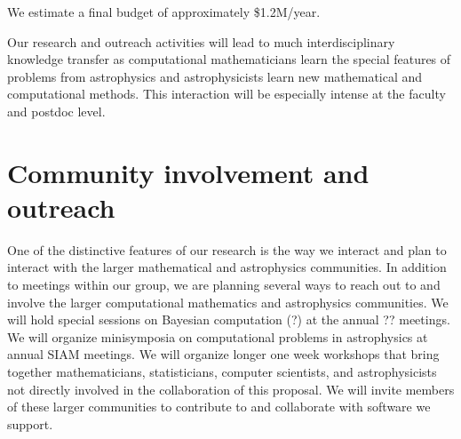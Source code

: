 \documentclass[12pt]{article}
\begin{document}
We estimate a final budget of approximately \$1.2M/year.

Our research and outreach activities will lead to much interdisciplinary knowledge transfer
as computational mathematicians learn the special features of problems from astrophysics
and astrophysicists learn new mathematical and computational methods.  
This interaction will be especially intense at the faculty and postdoc level.


\section*{Community involvement and outreach}
One of the distinctive features of our research is the way we interact and plan to interact
with the larger mathematical and astrophysics communities.
In addition to meetings within our group, we are planning several ways to reach out to
and involve the larger computational mathematics and astrophysics communities.
We will hold special sessions on Bayesian computation (?) at the annual ?? meetings.
We will organize minisymposia on computational problems in astrophysics at annual
SIAM meetings. 
We will organize longer one week workshops that bring together mathematicians, statisticians,
computer scientists, and astrophysicists not directly involved in the collaboration of this proposal.
We will invite members of these larger communities to contribute to and collaborate with 
software we support.
\end{document}
